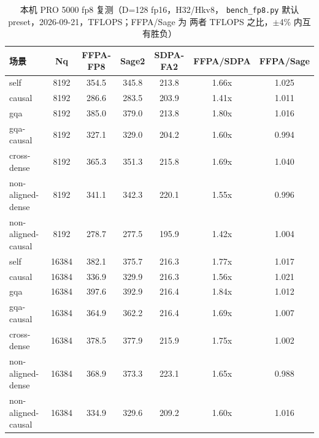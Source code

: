 \begin{table}[!htbp]
  \centering\small
  \caption{本机 PRO 5000 fp8 复测（D=128 fp16，H32/Hkv8，
  \texttt{bench\_fp8.py} 默认 preset，2026-09-21，TFLOPS；FFPA/Sage 为
  两者 TFLOPS 之比，$\pm$4\% 内互有胜负）}\label{tab:33-pro5000-fp8}
  \begin{tabular}{lcccccc}
    \toprule
    场景 & Nq & FFPA-FP8 & Sage2 & SDPA-FA2 & FFPA/SDPA & FFPA/Sage \\
    \midrule
    self               & 8192  & 354.5 & 345.8 & 213.8 & 1.66x & 1.025 \\
    causal             & 8192  & 286.6 & 283.5 & 203.9 & 1.41x & 1.011 \\
    gqa                & 8192  & 385.0 & 379.0 & 213.8 & 1.80x & 1.016 \\
    gqa-causal         & 8192  & 327.1 & 329.0 & 204.2 & 1.60x & 0.994 \\
    cross-dense        & 8192  & 365.3 & 351.3 & 215.8 & 1.69x & 1.040 \\
    non-aligned-dense  & 8192  & 341.1 & 342.3 & 220.1 & 1.55x & 0.996 \\
    non-aligned-causal & 8192  & 278.7 & 277.5 & 195.9 & 1.42x & 1.004 \\
    \midrule
    self               & 16384 & 382.1 & 375.7 & 216.3 & 1.77x & 1.017 \\
    causal             & 16384 & 336.9 & 329.9 & 216.3 & 1.56x & 1.021 \\
    gqa                & 16384 & 397.6 & 392.9 & 216.4 & 1.84x & 1.012 \\
    gqa-causal         & 16384 & 364.9 & 362.2 & 216.4 & 1.69x & 1.007 \\
    cross-dense        & 16384 & 378.5 & 377.9 & 215.9 & 1.75x & 1.002 \\
    non-aligned-dense  & 16384 & 368.9 & 373.3 & 223.1 & 1.65x & 0.988 \\
    non-aligned-causal & 16384 & 334.9 & 329.6 & 209.2 & 1.60x & 1.016 \\
    \bottomrule
  \end{tabular}
\end{table}

